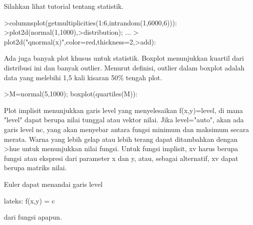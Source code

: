 \documentclass[a4paper,10pt]{article}
\begin{document}
\begin{eulernotebook}
\begin{eulercomment}
\begin{eulercomment}
\begin{eulercomment}
\begin{eulercomment}
\begin{eulercomment}
\begin{eulercomment}
\begin{eulercomment}
Silahkan lihat tutorial tentang statistik.
\end{eulercomment}
\begin{eulerprompt}
>columnsplot(getmultiplicities(1:6,intrandom(1,6000,6))):
>plot2d(normal(1,1000),>distribution); ...
>  plot2d("qnormal(x)",color=red,thickness=2,>add):
\end{eulerprompt}
\begin{eulercomment}
Ada juga banyak plot khusus untuk statistik. Boxplot menunjukkan
kuartil dari distribusi ini dan banyak outlier. Menurut definisi,
outlier dalam boxplot adalah data yang melebihi 1,5 kali kisaran 50\%
tengah plot.
\end{eulercomment}
\begin{eulerprompt}
>M=normal(5,1000); boxplot(quartiles(M)):
\end{eulerprompt}
\begin{eulercomment}
Plot implisit menunjukkan garis level yang menyelesaikan f(x,y)=level,
di mana "level" dapat berupa nilai tunggal atau vektor nilai. Jika
level="auto", akan ada garis level nc, yang akan menyebar antara
fungsi minimum dan maksimum secara merata. Warna yang lebih gelap atau
lebih terang dapat ditambahkan dengan \textgreater{}hue untuk menunjukkan nilai
fungsi. Untuk fungsi implisit, xv harus berupa fungsi atau ekspresi
dari parameter x dan y, atau, sebagai alternatif, xv dapat berupa
matriks nilai.

Euler dapat menandai garis level

lateks: f(x,y) = c

dari fungsi apapun.


\end{eulercomment}
\end{eulercomment}
\end{eulercomment}
\end{eulercomment}
\end{eulercomment}
\end{eulercomment}
\end{eulercomment}
\end{eulernotebook}
\end{document}
